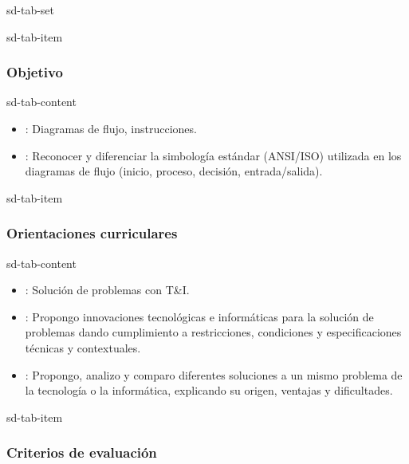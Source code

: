 \documentclass[letterpaper,10pt,spanish]{sphinxmanual}
\begin{document}
\begin{sphinxuseclass}{sd-tab-set}
\begin{sphinxuseclass}{sd-tab-item}\subsubsection*{Objetivo}

\begin{sphinxuseclass}{sd-tab-content}\begin{itemize}
\item {} 
\sphinxAtStartPar
{}: Diagramas de flujo, instrucciones.

\item {} 
\sphinxAtStartPar
{}: Reconocer y diferenciar la simbología estándar (ANSI/ISO) utilizada en los diagramas de flujo (inicio, proceso, decisión, entrada/salida).

\end{itemize}

\end{sphinxuseclass}
\end{sphinxuseclass}
\begin{sphinxuseclass}{sd-tab-item}\subsubsection*{Orientaciones curriculares}

\begin{sphinxuseclass}{sd-tab-content}\begin{itemize}
\item {} 
\sphinxAtStartPar
{}: Solución de problemas con T\&I.

\item {} 
\sphinxAtStartPar
{}: Propongo innovaciones tecnológicas e informáticas para la solución de problemas dando cumplimiento a restricciones, condiciones y especificaciones técnicas y contextuales.

\item {} 
\sphinxAtStartPar
{}: Propongo, analizo y comparo diferentes soluciones a un mismo problema de la tecnología o la informática, explicando su origen, ventajas y dificultades.

\end{itemize}

\end{sphinxuseclass}
\end{sphinxuseclass}
\begin{sphinxuseclass}{sd-tab-item}\subsubsection*{Criterios de evaluación}


\end{sphinxuseclass}
\end{sphinxuseclass}
\end{document}
